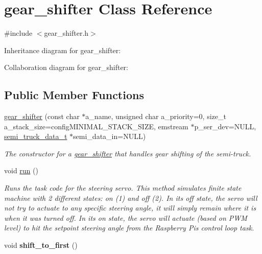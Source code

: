 \hypertarget{classgear__shifter}{}\section{gear\+\_\+shifter Class Reference}
\label{classgear__shifter}


{\ttfamily \#include $<$gear\+\_\+shifter.\+h$>$}



Inheritance diagram for gear\+\_\+shifter\+:


Collaboration diagram for gear\+\_\+shifter\+:
\subsection*{Public Member Functions}
\begin{DoxyCompactItemize}
\item 
\hyperlink{classgear__shifter_a0a83c40b155cead447d5fd8d3de67bcc}{gear\+\_\+shifter} (const char $\ast$a\+\_\+name, unsigned char a\+\_\+priority=0, size\+\_\+t a\+\_\+stack\+\_\+size=config\+M\+I\+N\+I\+M\+A\+L\+\_\+\+S\+T\+A\+C\+K\+\_\+\+S\+I\+ZE, emstream $\ast$p\+\_\+ser\+\_\+dev=N\+U\+LL, \hyperlink{structsemi__truck__data__t}{semi\+\_\+truck\+\_\+data\+\_\+t} $\ast$semi\+\_\+data\+\_\+in=N\+U\+LL)
\begin{DoxyCompactList}\small\item\em The constructor for a \hyperlink{classgear__shifter}{gear\+\_\+shifter} that handles gear shifting of the semi-\/truck. \end{DoxyCompactList}\item 
void \hyperlink{classgear__shifter_ab9e3d0fec33d3207d88f795a0ce3ffd8}{run} ()\hypertarget{classgear__shifter_ab9e3d0fec33d3207d88f795a0ce3ffd8}{}\label{classgear__shifter_ab9e3d0fec33d3207d88f795a0ce3ffd8}

\begin{DoxyCompactList}\small\item\em Runs the task code for the steering servo. This method simulates finite state machine with 2 different states\+: on (1) and off (2). In its off state, the servo will not try to actuate to any specific steering angle, it will simply remain where it is when it was turned off. In its on state, the servo will actuate (based on P\+WM level) to hit the setpoint steering angle from the Raspberry Pi\textquotesingle{}s control loop task. \end{DoxyCompactList}\item 
void {\bfseries shift\+\_\+to\+\_\+first} ()\hypertarget{classgear__shifter_ac8b9182b9f3b0be7e2e0d24c2e41dec9}{}\label{classgear__shifter_ac8b9182b9f3b0be7e2e0d24c2e41dec9}


\end{DoxyCompactItemize}
